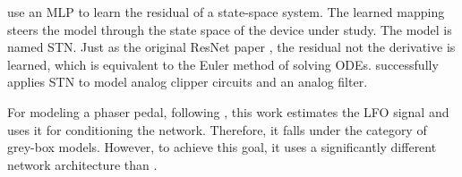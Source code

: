 \cite{Parker2019} use an \ac{MLP} to learn the residual of a state-space system. The learned mapping steers the model through the state space of the device under study. The model is named \ac{STN}. Just as the original \ac{ResNet} paper \cite{He2015}, the residual not the derivative is learned, which is equivalent to the Euler method of solving \acp{ODE}. \cite{Parker2019} successfully applies \ac{STN} to model analog clipper circuits and an analog filter.

For modeling a phaser pedal, following \cite{Wright2020}, this work estimates the \ac{LFO} signal and uses it for conditioning the network. Therefore, it falls under the category of grey-box models. However, to achieve this goal, it uses a significantly different network architecture than \cite{Wright2020}.

